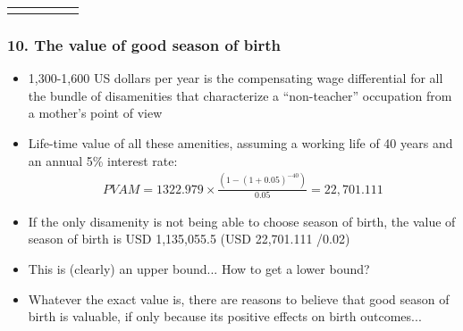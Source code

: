 \documentclass[10pt,letterpaper,subeqn]{beamer}
\begin{document}
\begin{frame}
\begin{table}[htbp]
{\begin{tabular}{l*{4}{c}}
{\begin{footnotesize}
\end{footnotesize}}\end{tabular}}
\end{table}
\end{frame}



\begin{frame}%
\frametitle{10. The value of good season of birth}
\begin{itemize}
\item 1,300-1,600 US dollars per year is the compensating wage differential for all the bundle of disamenities that characterize a ``non-teacher'' occupation from a mother's point of view
\item Life-time value of all these amenities, assuming a working life of 40 years and an annual 5\% interest rate:
\begin{align}
PVAM = 1322.979 \times \frac{(1-(1+0.05)^{-40})}{0.05} = 22,701.111
\end{align}
\item If the only disamenity is not being able to choose season of birth, the value of season of birth is USD 1,135,055.5 (USD 22,701.111 /0.02)
\item This is (clearly) an upper bound... How to get a lower bound?
\item Whatever the exact value is, there are reasons to believe that good season of birth is valuable, if only because its positive effects on birth outcomes...
\end{itemize}
\end{frame}

 
\end{document}
